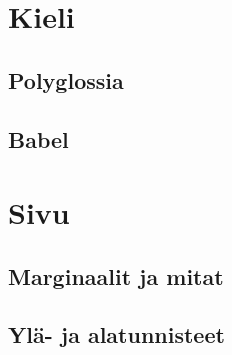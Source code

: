 \section{Kieli}
\label{luku:kieliasetukset}

\subsection{Polyglossia}
\subsection{Babel}

\section{Sivu}
\label{luku:sivuasetukset}
\subsection{Marginaalit ja mitat}
\subsection{Ylä- ja alatunnisteet}
